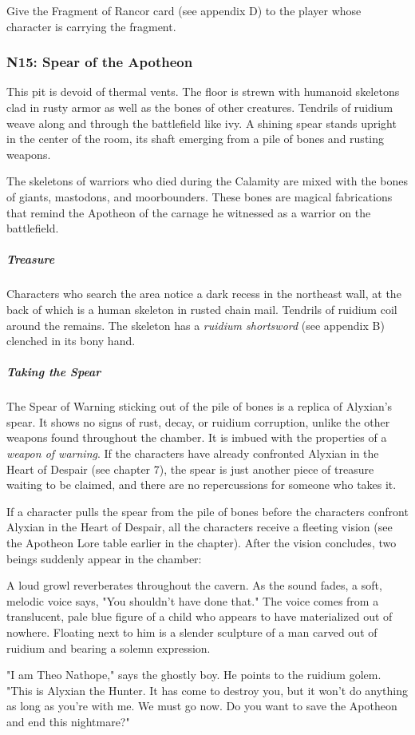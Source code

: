 \documentclass[10pt,a4paper,twoside,bg=print,twocolumn,openany,nodeprecatedcode]{dndbook}
\begin{document}
Give the Fragment of Rancor card (see appendix D) to the player whose character is carrying the fragment.

\subsubsection{N15: Spear of the Apotheon}
\begin{DndReadAloud}{}
This pit is devoid of thermal vents. The floor is strewn with humanoid skeletons clad in rusty armor as well as the bones of other creatures. Tendrils of ruidium weave along and through the battlefield like ivy. A shining spear stands upright in the center of the room, its shaft emerging from a pile of bones and rusting weapons.

\end{DndReadAloud}

The skeletons of warriors who died during the Calamity are mixed with the bones of giants, mastodons, and moorbounders. These bones are magical fabrications that remind the Apotheon of the carnage he witnessed as a warrior on the battlefield.

\subparagraph{Treasure}
Characters who search the area notice a dark recess in the northeast wall, at the back of which is a human skeleton in rusted chain mail. Tendrils of ruidium coil around the remains. The skeleton has a \textit{ruidium shortsword} (see appendix B) clenched in its bony hand.

\subparagraph{Taking the Spear}
The Spear of Warning sticking out of the pile of bones is a replica of Alyxian's spear. It shows no signs of rust, decay, or ruidium corruption, unlike the other weapons found throughout the chamber. It is imbued with the properties of a \textit{weapon of warning}. If the characters have already confronted Alyxian in the Heart of Despair (see chapter 7), the spear is just another piece of treasure waiting to be claimed, and there are no repercussions for someone who takes it.

If a character pulls the spear from the pile of bones before the characters confront Alyxian in the Heart of Despair, all the characters receive a fleeting vision (see the Apotheon Lore table earlier in the chapter). After the vision concludes, two beings suddenly appear in the chamber:

\begin{DndReadAloud}{}
A loud growl reverberates throughout the cavern. As the sound fades, a soft, melodic voice says, "You shouldn't have done that." The voice comes from a translucent, pale blue figure of a child who appears to have materialized out of nowhere. Floating next to him is a slender sculpture of a man carved out of ruidium and bearing a solemn expression.

"I am Theo Nathope," says the ghostly boy. He points to the ruidium golem. "This is Alyxian the Hunter. It has come to destroy you, but it won't do anything as long as you're with me. We must go now. Do you want to save the Apotheon and end this nightmare?"

\end{DndReadAloud}
\end{document}
